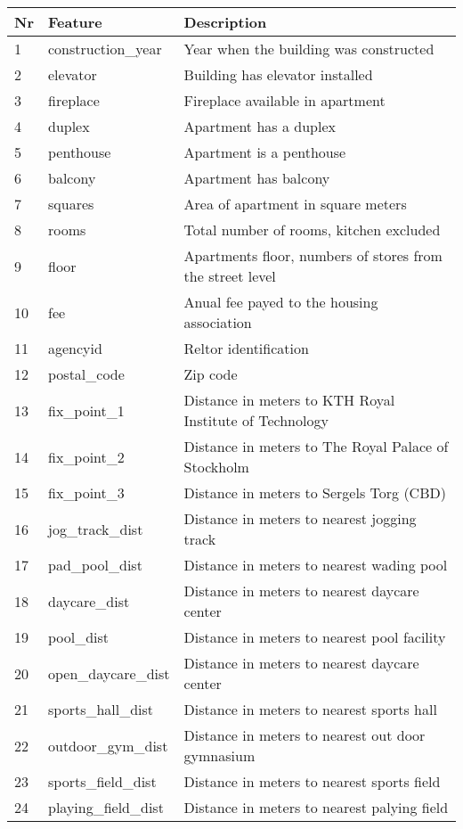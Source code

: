 \begin{table}[H]
\begin{tabular}{ | l | l | p{7cm} | } 
\hline 
Nr & Feature & Description \\
\hline
\hline
1 & construction\_year & Year when the building was constructed \\
2 & elevator & Building has elevator installed \\
3 & fireplace & Fireplace available in apartment \\
4 & duplex & Apartment has a duplex \\
5 & penthouse & Apartment is a penthouse \\
6 & balcony & Apartment has balcony \\
7 & squares & Area of apartment in square meters \\
8 & rooms & Total number of rooms, kitchen excluded \\
9 & floor & Apartments floor, numbers of stores from the street level \\
10 & fee & Anual fee payed to the housing association \\
11 & agencyid & Reltor identification \\
\hline
12 & postal\_code & Zip code \\
13 & fix\_point\_1 & Distance in meters to KTH Royal Institute of Technology \\
14 & fix\_point\_2 & Distance in meters to The Royal Palace of Stockholm \\
15 & fix\_point\_3 & Distance in meters to Sergels Torg (CBD) \\
\hline
16 & jog\_track\_dist & Distance in meters to nearest jogging track \\
17 & pad\_pool\_dist & Distance in meters to nearest wading pool \\
18 & daycare\_dist & Distance in meters to nearest daycare center \\
19 & pool\_dist & Distance in meters to nearest pool facility \\
20 & open\_daycare\_dist & Distance in meters to nearest daycare center \\
21 & sports\_hall\_dist & Distance in meters to nearest sports hall \\
22 & outdoor\_gym\_dist & Distance in meters to nearest out door gymnasium \\
23 & sports\_field\_dist & Distance in meters to nearest sports field\\
24 & playing\_field\_dist & Distance in meters to nearest palying field \\

\end{tabular}
\end{table}
